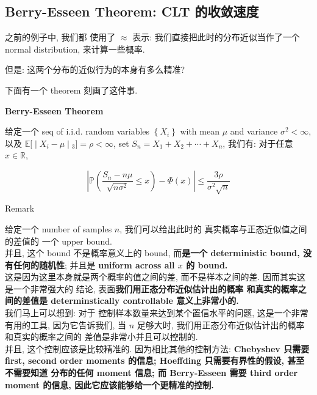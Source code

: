 \documentclass{qlnotes-export}
\begin{document}
\subsection{Berry-Esseen Theorem: CLT 的收敛速度}\label{berry-esseen-theorem-clt-ux7684ux6536ux655bux901fux5ea6}

之前的例子中, 我们都 使用了 \(\approx\) 表示: 我们直接把此时的分布近似当作了一个 normal distribution, 来计算一些概率.

但是: 这两个分布的近似行为的本身有多么精准?

下面有一个 theorem 刻画了这件事.

\begin{theorem}{\protect{}\label{kn-berry-esseen-theorem}{\textbf{Berry-Esseen
Theorem}}}

给定一个 seq of i.i.d. random variables \(\left\{ X_{i} \right\}\) with mean \(\mu\) and variance \(\sigma^{2} < \infty\), 以及 \(\left. {\mathbb{E}}\lbrack \middle| X_{i} - \mu \middle| {}_{3}\rbrack = \rho < \infty \right.\), set \(S_{n} = X_{1} + X_{2} + \cdots + X_{n}\), 我们有: 对于任意 \(x \in {\mathbb{R}}\),

\[\left| {{\mathbb{P}}\left( {\frac{S_{n} - n\mu}{\sqrt{n\sigma^{2}}} \leq x} \right) - \Phi(x)} \right| \leq \frac{3\rho}{\sigma^{2}\sqrt{n}}\]

\end{theorem}

\begin{qlremark}{Remark}

给定一个 number of samples \(n\), 我们可以给出此时的 真实概率与正态近似值之间的差值的 一个 upper bound.\\
并且, 这个 bound 不是概率意义上的 bound, 而\textbf{是一个 deterministic bound, 没有任何的随机性}; 并且是 \textbf{uniform across all \(x\) 的 bound.}\\
这是因为这里本身就是两个概率的值之间的差, 而不是样本之间的差. 因而其实这是一个非常强大的 结论, 表面\textbf{我们用正态分布近似估计出的概率 和真实的概率之间的差值是 determinstically controllable 意义上非常小的.}\\
我们马上可以想到: 对于 控制样本数量来达到某个置信水平的问题, 这是一个非常有用的工具, 因为它告诉我们, 当 \(n\) 足够大时, 我们用正态分布近似估计出的概率和真实的概率之间的 差值是非常小并且可以控制的.\\
并且, 这个控制应该是比较精准的. 因为相比其他的控制方法: \textbf{Chebyshev 只需要 first, second order moments 的信息; Hoeffding 只需要有界性的假设, 甚至不需要知道 分布的任何 moment 信息; 而 Berry-Esseen 需要 third order moment 的信息, 因此它应该能够给一个更精准的控制.}

\end{qlremark}
\end{document}
